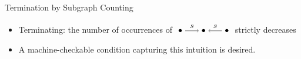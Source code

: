 \documentclass{beamer}
\newcommand{\graphbox}[8]{
  \begin{scope}[xshift=#2,yshift=#3]
    \draw [rounded corners=2mm] (0,0) rectangle (#4,-#5);
    \node at (0,0mm) [anchor=north west,inner sep=1mm] {#1};
    \begin{scope}[xshift=#4/2+#6,yshift=#7] 
    #8
    \end{scope}
  \end{scope}
}
\newcommand{\opn}[1]{\operatorname{#1}}
\begin{document}
\begin{frame}{Termination by Subgraph Counting}
\begin{itemize}
{
            }
        \item  Terminating: the number of occurrences of $\tikz[baseline=-0.5ex]{ 
                \node (x) at (0,0) {$\bullet$}; 
                \node (y) at (1,0) {$\bullet$};
                \node (z) at (2,0) {$\bullet$};
                \draw[->] (x) -- (y) node[midway, above] {$s$};
                \draw[->] (z) -- (y) node[midway, above] {$s$};
        }$ strictly decreases
        \item A machine-checkable condition capturing this intuition is desired.
    \end{itemize}
    

   

    
\end{frame}



\end{document}
